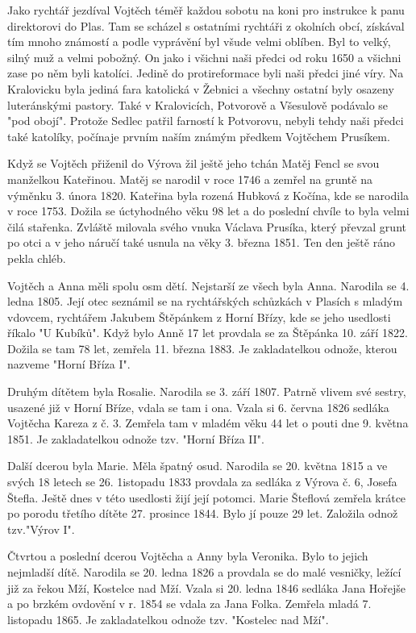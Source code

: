 \documentclass[../dejiny-rodu-prusiku.tex]{subfiles}
\begin{document}
Jako rychtář jezdíval Vojtěch téměř každou sobotu na koni pro instrukce k panu direktorovi do Plas. Tam se scházel s ostatními rychtáři z okolních obcí, získával tím mnoho známostí a podle vyprávění byl všude velmi oblíben. Byl to velký, silný muž a velmi pobožný. On jako i všichni naši předci od roku 1650 a všichni zase po něm byli katolíci. Jedině do proti­reformace byli naši předci jiné víry. Na Kralovicku byla jediná fara katolická v Žebnici a všechny ostat­ní byly osazeny luteránskými pastory. Také v Kralo­vicích, Potvorově a Všesulově podávalo se "pod obojí". Protože Sedlec patřil farností k Potvorovu, nebyli tehdy naši předci také katolíky, počínaje prvním na­ším známým předkem Vojtěchem Prusíkem.

Když se Vojtěch přiženil do Výrova žil ještě jeho tchán Matěj Fencl se svou manželkou Kateřinou. Matěj se narodil v roce 1746 a zemřel na gruntě na výměnku 3. února 1820. Kateřina byla rozená Hubková z Kočína, kde se narodila v roce 1753. Dožila se úctyhodného vě­ku 98 let a do poslední chvíle to byla velmi čilá stařenka. Zvláště milovala svého vnuka Václava Prusíka, který převzal grunt po otci a v jeho náručí také usnula na věky 3. března 1851. Ten den ještě ráno pekla chléb.

Vojtěch a Anna měli spolu osm dětí. Nejstarší ze všech byla Anna. Narodila se 4. ledna 1805. Její otec seznámil se na rychtářských schůzkách v Plasích s mladým vdovcem, rychtářem Jakubem Štěpánkem z Horní Břízy, kde se jeho usedlosti říkalo "U Kubíků". Když bylo Anně 17 let provdala se za Štěpánka 10. září 1822. Dožila se tam 78 let, zemřela 11. března 1883. Je zakladatelkou odnože, kterou nazveme "Horní Bříza I".

Druhým dítětem byla Rosalie. Narodila se 3. září 1807. Patrně vlivem své sestry, usazené již v Horní Bříze, vdala se tam i ona. Vzala si 6. června 1826 sedláka Vojtěcha Kareza z č. 3. Zemřela tam v mladém věku 44 let o pouti dne 9. května 1851. Je zakladatelkou odnože tzv. "Horní Bříza II".

Další dcerou byla Marie. Měla špatný osud. Narodila se 20. května 1815 a ve svých 18 letech se 26. 1istopadu 1833 provdala za sedláka z Výrova č. 6, Josefa Štefla. Ještě dnes v této usedlosti žijí její potomci. Marie Šteflová zemřela krátce po porodu třetího dítěte 27. prosince 1844. Bylo jí pouze 29 let. Založila odnož tzv."Výrov I".

Čtvrtou a poslední dcerou Vojtěcha a Anny byla Veronika. Bylo to jejich nejmladší dítě. Narodila se 20. ledna 1826 a provdala se do malé vesničky, ležící již za řekou Mží, Kostelce nad Mží. Vzala si 20. ledna 1846 sedláka Jana Hořejše a po brzkém ovdovění v r. 1854 se vdala za Jana Folka. Zemřela mladá 7. listopadu 1865. Je zakladatelkou odnože tzv. "Kostelec nad Mží".
\end{document}
